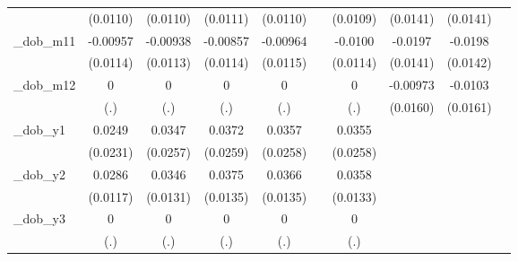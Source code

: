 \begin{table}[htbp]
\begin{tabular}{l*{9}{c}}
            &    (0.0110)         &    (0.0110)         &    (0.0111)         &    (0.0110)         &                     &    (0.0109)         &    (0.0141)         &    (0.0141)         &                     \\
[1em]
\_dob\_m11    &    -0.00957         &    -0.00938         &    -0.00857         &    -0.00964         &                     &     -0.0100         &     -0.0197         &     -0.0198         &                     \\
            &    (0.0114)         &    (0.0113)         &    (0.0114)         &    (0.0115)         &                     &    (0.0114)         &    (0.0141)         &    (0.0142)         &                     \\
[1em]
\_dob\_m12    &           0         &           0         &           0         &           0         &                     &           0         &    -0.00973         &     -0.0103         &                     \\
            &         (.)         &         (.)         &         (.)         &         (.)         &                     &         (.)         &    (0.0160)         &    (0.0161)         &                     \\
[1em]
\_dob\_y1     &      0.0249         &      0.0347         &      0.0372         &      0.0357         &                     &      0.0355         &                     &                     &                     \\
            &    (0.0231)         &    (0.0257)         &    (0.0259)         &    (0.0258)         &                     &    (0.0258)         &                     &                     &                     \\
[1em]
\_dob\_y2     &      0.0286\sym{**} &      0.0346\sym{***}&      0.0375\sym{***}&      0.0366\sym{***}&                     &      0.0358\sym{***}&                     &                     &                     \\
            &    (0.0117)         &    (0.0131)         &    (0.0135)         &    (0.0135)         &                     &    (0.0133)         &                     &                     &                     \\
[1em]
\_dob\_y3     &           0         &           0         &           0         &           0         &                     &           0         &                     &                     &                     \\
            &         (.)         &         (.)         &         (.)         &         (.)         &                     &         (.)         &                     &                     &                     \\

\end{tabular}
\end{table}
